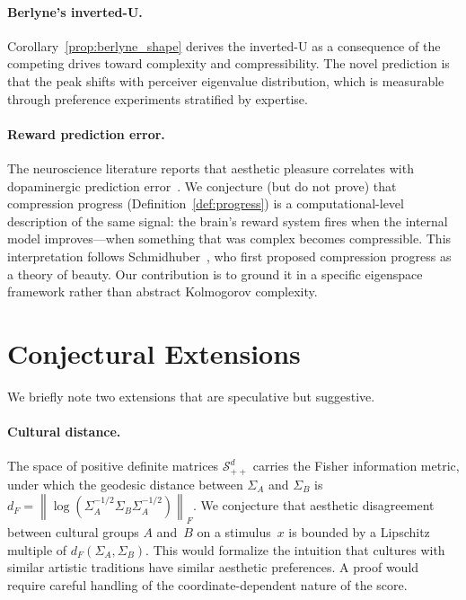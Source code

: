 \documentclass[journal]{IEEEtran}
\theoremstyle{definition}
\theoremstyle{remark}
\newcommand{\norm}[1]{\left\lVert #1 \right\rVert}
\begin{document}
\paragraph{Berlyne's inverted-U.}
Corollary~\ref{prop:berlyne_shape} derives the inverted-U as a
consequence of the competing drives toward complexity and
compressibility.  The novel prediction is that the peak shifts with
perceiver eigenvalue distribution, which is measurable through
preference experiments stratified by expertise.

\paragraph{Reward prediction error.}
The neuroscience literature reports that aesthetic pleasure
correlates with dopaminergic prediction
error~\cite{salimpoor2011anatomically}.  We conjecture
(but do not prove) that compression progress
(Definition~\ref{def:progress}) is a computational-level description
of the same signal: the brain's reward system fires when the
internal model improves---when something that was complex becomes
compressible.  This interpretation follows
Schmidhuber~\cite{schmidhuber2009simple}, who first proposed
compression progress as a theory of beauty.  Our contribution is to
ground it in a specific eigenspace framework rather than abstract
Kolmogorov complexity.


\section{Conjectural Extensions}
\label{sec:conjectural}

We briefly note two extensions that are speculative but
suggestive.

\paragraph{Cultural distance.}
The space of positive definite matrices $\mathcal{S}_{++}^d$
carries the Fisher information metric, under which the geodesic
distance between $\Sigma_A$ and $\Sigma_B$ is
$d_F = \norm{\log(\Sigma_A^{-1/2}\Sigma_B\Sigma_A^{-1/2})}_F$.
We conjecture that aesthetic disagreement between cultural groups
$A$ and~$B$ on a stimulus~$x$ is bounded by a Lipschitz multiple
of $d_F(\Sigma_A, \Sigma_B)$.  This would formalize the intuition
that cultures with similar artistic traditions have similar aesthetic
preferences.  A proof would require careful handling of the
coordinate-dependent nature of the score.
\end{document}
